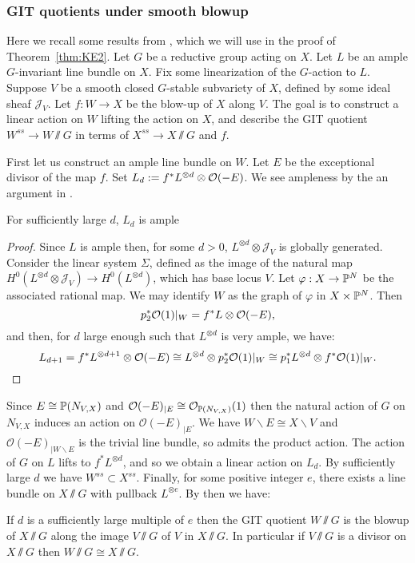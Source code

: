 \subsubsection{GIT quotients under smooth blowup}
Here we recall some results from \cite{kirwan}, which we will use in the proof of Theorem~\ref{thm:KE2}. Let \(G\) be a reductive group acting on \(X\). Let \(L\) be an ample \(G\)-invariant line bundle on \(X\). Fix some linearization of the \(G\)-action to \(L\). Suppose \(V\) be a smooth closed \(G\)-stable subvariety of \(X\), defined by some ideal sheaf \(\mathcal{J}_V\). Let \(f:W \to X\) be the blow-up of \(X\) along \(V\). The goal is to construct a linear action on \(W\) lifting the action on \(X\), and describe the GIT quotient \(W^{ss} \to W \sslash G\) in terms of \(X^{ss} \to  X \sslash G\) and \(f\).

First let us construct an ample line bundle on \(W\). Let \(E\) be the exceptional divisor of the map \(f\). Set \(L_d := f^* L^{\otimes d} \otimes \mathcal{O}(-E)\). We see ampleness by the an argument in \cite{}.
\begin{lemma}
For sufficiently large \(d\), \(L_d\) is ample
\end{lemma}
\begin{proof}
Since \(L\) is ample then, for some \(d>0\), \(L^{\otimes d} \otimes \mathcal{J}_V\) is globally generated. Consider the linear system \(\Sigma \), defined as the image of the natural map \(H^0(L^{\otimes d} \otimes \mathcal{J}_V) \to H^0(L^{\otimes d})\), which has base locus \(V\). Let \(\varphi: X \to \mathbb{P}^N\) be the associated rational map. We may identify \(W\) as the graph of \(\varphi\) in \(X \times \mathbb{P}^N\). Then
\[
p_2^* \mathcal{O}(1) |_W = f^*L \otimes \mathcal{O}(-E),
\]
and then, for \(d\) large enough such that \(L^{\otimes d}\) is very ample, we have:
\[
L_{d+1} = f^*L^{\otimes d+1} \otimes \mathcal{O}(-E) \cong L^{\otimes d} \otimes p_2^* \mathcal{O}(1) |_W \cong p_1^* L^{\otimes d} \otimes f^* \mathcal{O}(1) |_W.
\]
\end{proof}
Since \(E \cong \mathbb{P}(N_{V,X})\) and \(\mathcal{O}(-E)_{|E} \cong \mathcal{O}_{\mathbb{P}(N_{V,X})}(1)\) then the natural action of \(G\) on \(N_{V,X}\) induces an action on \(\mathcal{O}(-E)_{|E}\). We have \(W \backslash E \cong X \backslash V\) and \(\mathcal{O}(-E)_{|W \backslash E}\) is the trivial line bundle, so admits the product action. The action of \(G\) on \(L\) lifts to \(f^* L^{\otimes d} \), and so we obtain a linear action on \(L_d\). By \cite[]{kirwan} sufficiently large \(d\) we have \(W^{ss} \subset X^{ss}\). Finally, for some positive integer \(e\), there exists a line bundle on \(X \sslash G\) with pullback \(L^{\otimes e}\). By \cite{Aubin1976} then we have:
\begin{lemma}
If \(d\) is a sufficiently large multiple of \(e\) then the GIT quotient \(W \sslash G\) is the blowup of \(X \sslash G\) along the image \(V \sslash G\) of \(V\) in \(X \sslash G\). In particular if \(V \sslash G\) is a divisor on \(X \sslash G\) then \(W \sslash G \cong X \sslash G\).
\end{lemma}

